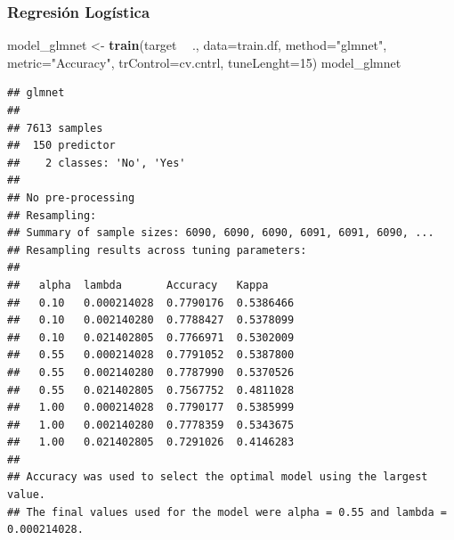 \documentclass[
]{article}
\newenvironment{Shaded}{\begin{snugshade}}{\end{snugshade}}
\newcommand{\DataTypeTok}[1]{\textcolor[rgb]{0.13,0.29,0.53}{#1}}
\newcommand{\DecValTok}[1]{\textcolor[rgb]{0.00,0.00,0.81}{#1}}
\newcommand{\KeywordTok}[1]{\textcolor[rgb]{0.13,0.29,0.53}{\textbf{#1}}}
\newcommand{\NormalTok}[1]{#1}
\newcommand{\OperatorTok}[1]{\textcolor[rgb]{0.81,0.36,0.00}{\textbf{#1}}}
\newcommand{\OtherTok}[1]{\textcolor[rgb]{0.56,0.35,0.01}{#1}}
\newcommand{\StringTok}[1]{\textcolor[rgb]{0.31,0.60,0.02}{#1}}
\begin{document}
\begin{Shaded}
\end{Shaded}

\hypertarget{regresiuxf3n-loguxedstica}{%
\subsubsection{Regresión Logística}\label{regresiuxf3n-loguxedstica}}

\begin{Shaded}
\begin{Highlighting}[]
\NormalTok{model_glmnet <-}\StringTok{ }\KeywordTok{train}\NormalTok{(target }\OperatorTok{~}\StringTok{ }\NormalTok{., }\DataTypeTok{data=}\NormalTok{train.df,}
                      \DataTypeTok{method=}\StringTok{"glmnet"}\NormalTok{,}
                      \DataTypeTok{metric=}\StringTok{"Accuracy"}\NormalTok{,}
                      \DataTypeTok{trControl=}\NormalTok{cv.cntrl,}
                      \DataTypeTok{tuneLenght=}\DecValTok{15}\NormalTok{)}
\NormalTok{model_glmnet}
\end{Highlighting}
\end{Shaded}

\begin{verbatim}
## glmnet 
## 
## 7613 samples
##  150 predictor
##    2 classes: 'No', 'Yes' 
## 
## No pre-processing
## Resampling: 
## Summary of sample sizes: 6090, 6090, 6090, 6091, 6091, 6090, ... 
## Resampling results across tuning parameters:
## 
##   alpha  lambda       Accuracy   Kappa    
##   0.10   0.000214028  0.7790176  0.5386466
##   0.10   0.002140280  0.7788427  0.5378099
##   0.10   0.021402805  0.7766971  0.5302009
##   0.55   0.000214028  0.7791052  0.5387800
##   0.55   0.002140280  0.7787990  0.5370526
##   0.55   0.021402805  0.7567752  0.4811028
##   1.00   0.000214028  0.7790177  0.5385999
##   1.00   0.002140280  0.7778359  0.5343675
##   1.00   0.021402805  0.7291026  0.4146283
## 
## Accuracy was used to select the optimal model using the largest value.
## The final values used for the model were alpha = 0.55 and lambda = 0.000214028.
\end{verbatim}
\end{document}

